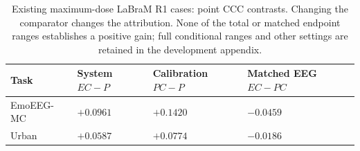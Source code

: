 \begin{table}[t]\centering\small
\caption{Existing maximum-dose LaBraM R1 cases: point CCC contrasts. Changing the comparator changes the attribution. None of the total or matched endpoint ranges establishes a positive gain; full conditional ranges and other settings are retained in the development appendix.}
\label{tab:v14-cases}
\begin{tabularx}{\linewidth}{@{}lXXX@{}}\toprule
Task & System $EC-P$ & Calibration $PC-P$ & Matched EEG $EC-PC$\\\midrule
EmoEEG-MC & $+0.0961$ & $+0.1420$ & $-0.0459$ \\
Urban & $+0.0587$ & $+0.0774$ & $-0.0186$ \\
\bottomrule\end{tabularx}
\end{table}
